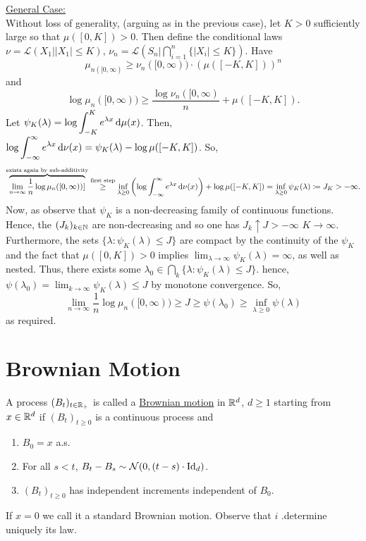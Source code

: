 \documentclass{article}
\begin{document}
\underline{General Case:}\\ 

Without loss of generality, (arguing as in the previous case), let $ K>0$ sufficiently large so that $ \mu([0, K])>0$. Then define the conditional laws $ \nu = \mathcal{L}(X_{1}| |X_{1}|\leq K)$, $ \nu_{n} = \mathcal{L}\left(S_{n}\Big| \displaystyle\bigcap^n_{i = 1} \{|X_{i}|\leq K\}\right)$. Have 
\[
	\mu_{n([0,\infty)}\geq \nu_{n}([0,\infty))\cdot (\mu([-K,K]))^{n}
\]
and 
\[
\log \mu_{n}([0,\infty))\geq \frac{\log \nu_{n}([0,\infty)
}{n} +\mu([-K, K]).
\]
Let $ \psi_{K}(\lambda) = \log \displaystyle\int^{K}_{-K} e^{\lambda x}\operatorname{d}\!\mu(x)$. Then, 
$ \log \displaystyle\int^{\infty}_{-\infty}e^{\lambda x} \operatorname{d}\! \nu(x) = \psi_{K}(\lambda) -\log\mu([-K,K]) $. So, 
\[
	\overbrace{\lim_{n \to \infty}\frac{1}{n}\log\mu_{n}([0,\infty))]}^{ \text{exists again by sub-additivity}} \stackrel{\text{first step}}{\geq} \displaystyle\inf_{\lambda\geq 0} \left( \log \displaystyle\int^{\infty}_{-\infty}e^{\lambda x} \operatorname{d}\! \nu(x)   \right)+ \log\mu([-K,K]) = \displaystyle\inf_{\lambda \geq 0}\psi_{K}(\lambda) \coloneqq J_{K}>-\infty.\\ 
\]
Now, as observe that $ \psi_{K}$ is a non-decreasing family of continuous functions. Hence, the $(J_{k})_{k\in \mathbb{N}}$ are non-decreasing and so one has $ J_{k}\uparrow J>-\infty$ $ K\to \infty$. Furthermore, the sets $ \{\lambda: \psi_{K}(\lambda)\leq J\}$ are compact by the continuity of the $ \psi_{K}$and the fact that $ \mu([0,K])>0$ implies $ \displaystyle\lim_{\lambda  \to \infty}\psi_{K}(\lambda) = \infty $, as well as nested. Thus, there exists some $ \lambda_{0}\in \displaystyle\bigcap_{k} \{\lambda: \psi_{K}(\lambda)\leq J\}$. hence, $ \psi(\lambda_{0}) = \displaystyle\lim_{k\to\infty}\psi_{K}(\lambda)\leq J $ by monotone convergence. So, 
	\[
\lim_{n \to \infty}\frac{1}{n}\log\mu_{n}([0,\infty)) \geq J\geq \psi(\lambda_{0})\geq \displaystyle\inf_{\lambda\geq 0 }\psi(\lambda)
	\] 
as required.\\

\newpage
\section{Brownian Motion}\label{Brownian motion}
\begin{boxdef}\label{def: Brownian motion}
	A process $ (B_{t})_{t\in \mathbb{R}_{+}}$ is called a \underline{Brownian motion} in $ \mathbb{R}^{d}$, $ d\geq 1$ starting from $ x\in \mathbb{R}^{d}$ if $ (B_{t})_{t\geq 0}$ is a continuous process and 
	\begin{enumerate}
		\item $ B_{0} = x$ a.s.
		\item For all $ s<t$, $ B_{t}-B_{s}\sim \mathcal{N}(0, (t-s)\cdot \operatorname{Id}_{d})$. 
		\item $ (B_{t})_{t\geq 0}$ has independent increments independent of $ B_{0}$. 
	\end{enumerate}
	If $ x = 0$ we call it a standard Brownian motion. Observe that $ i$ .determine uniquely its law.
\end{boxdef}
\end{document}
